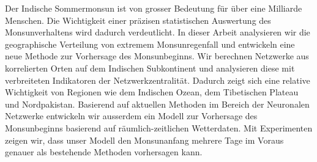 \begin{zusammenfassung}
Der Indische Sommermonsun ist von grosser Bedeutung für über eine Milliarde Menschen. Die Wichtigkeit einer präzisen statistischen Auswertung des Monsunverhaltens wird dadurch verdeutlicht. In dieser Arbeit analysieren wir die geographische Verteilung von extremem Monsunregenfall und entwickeln eine neue Methode zur Vorhersage des Monsunbeginns. Wir berechnen Netzwerke aus korrelierten Orten auf dem Indischen Subkontinent und analysieren diese mit verbreiteten Indikatoren der Netzwerkzentralität. Dadurch zeigt sich eine relative Wichtigkeit von Regionen wie dem Indischen Ozean, dem Tibetischen Plateau und Nordpakistan. Basierend auf aktuellen Methoden im Bereich der Neuronalen Netzwerke entwickeln wir ausserdem ein Modell zur Vorhersage des Monsunbeginns basierend auf räumlich-zeitlichen Wetterdaten. Mit Experimenten zeigen wir, dass unser Modell den Monsunanfang mehrere Tage im Voraus genauer als bestehende Methoden vorhersagen kann.
\end{zusammenfassung}
